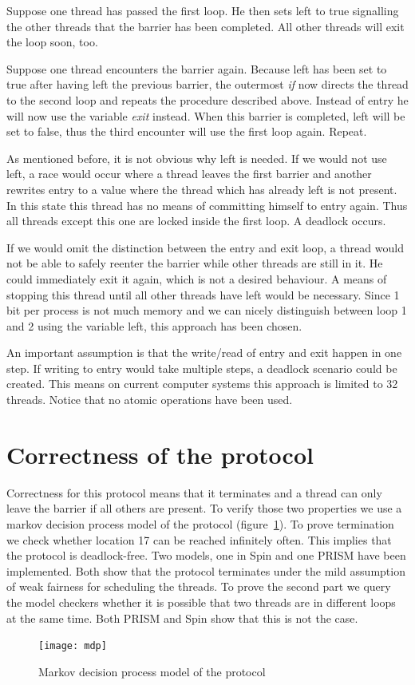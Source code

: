 \documentclass[a4paper, 10pt]{article}
\begin{document}
Suppose one thread has passed the first loop. He then sets left to true signalling the other threads that the barrier has been completed. All other threads will exit the loop soon, too.

Suppose one thread encounters the barrier again. Because left has been set to true after having left the previous barrier, the outermost \emph{if} now directs the thread to the second loop and repeats the procedure described above. Instead of entry he will now use the variable \emph{exit} instead. When this barrier is completed, left will be set to false, thus the third encounter will use the first loop again. Repeat.

As mentioned before, it is not obvious why left is needed. If we would not use left, a race would occur where a thread leaves the first barrier and another rewrites entry to a value where the thread which has already left is not present. In this state this thread has no means of committing himself to entry again. Thus all threads except this one are locked inside the first loop. A deadlock occurs.

If we would omit the distinction between the entry and exit loop, a thread would not be able to safely reenter the barrier while other threads are still in it. He could immediately exit it again, which is not a desired behaviour. A means of stopping this thread until all other threads have left would be necessary. Since 1 bit per process is not much memory and we can nicely distinguish between loop 1 and 2 using the variable left, this approach has been chosen.

An important assumption is that the write/read of entry and exit happen in one step. If writing to entry would take multiple steps, a deadlock scenario could be created. This means on current computer systems this approach is limited to 32 threads. Notice that no atomic operations have been used.

\section{Correctness of the protocol}
Correctness for this protocol means that it terminates and a thread can only leave the barrier if all others are present. To verify those two properties we use a markov decision process model of the protocol (figure~\ref{fig:mdp}). To prove termination we check whether location 17 can be reached infinitely often. This implies that the protocol is deadlock-free. Two models, one in Spin\cite{spin} and one PRISM\cite{prism} have been implemented. Both show that the protocol terminates under the mild assumption of weak fairness for scheduling the threads. To prove the second part we query the model checkers whether it is possible that two threads are in different loops at the same time. Both PRISM and Spin show that this is not the case.
\begin{figure}[htbp]
	\centering
	\texttt{[image: mdp]}
	\caption{Markov decision process model of the protocol}
	\label{fig:mdp}
\end{figure}
\end{document}
